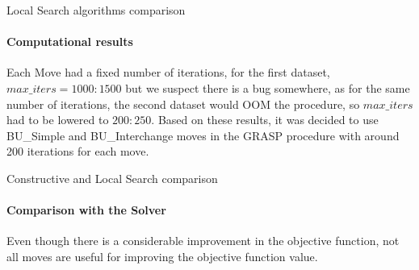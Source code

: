 \documentclass{beamer}
\begin{document}
\begin{frame}{Local Search algorithms comparison}
    \framesubtitle{Computational results}
    \begin{table}
        \centering
        \caption{Summary of the experiment results}
        \label{tab:ls_improv_exp}
    \end{table}
    Each Move had a fixed number of iterations, for the first dataset, $max\_iters = 1000:1500$ but we suspect there is a bug somewhere, as for the same number of iterations, the second dataset would OOM the procedure, so $max\_iters$ had to be lowered to $200:250$.
    Based on these results, it was decided to use BU\_Simple and BU\_Interchange moves in the GRASP procedure with around 200 iterations for each move.
\end{frame}

\begin{frame}{Constructive and Local Search comparison}
    \framesubtitle{Comparison with the Solver}
    \begin{table}
        \centering
        \caption{Summary of the experiment results}
        \label{tab:constructive_ls_optim_comp}
    \end{table}
    Even though there is a considerable improvement in the objective function, not all moves are useful for improving the objective function value.
\end{frame}
\end{document}
